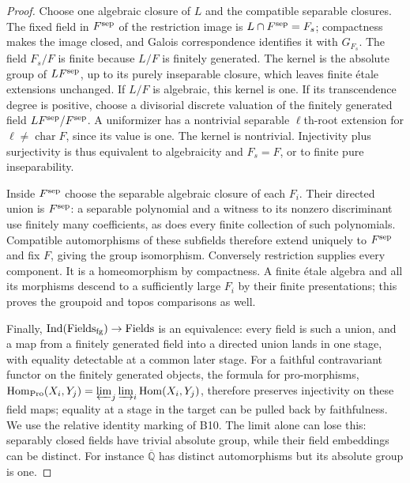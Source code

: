 \begin{proof}
Choose one algebraic closure of $L$ and the compatible separable
closures. The fixed field in $F^{\rm sep}$ of the restriction image
is $L\cap F^{\rm sep}=F_s$; compactness makes the image closed,
and Galois correspondence identifies it with $G_{F_s}$. The field
$F_s/F$ is finite because $L/F$ is finitely generated. The kernel
is the absolute group of $LF^{\rm sep}$, up to its purely
inseparable closure, which leaves finite \'etale extensions unchanged.
If $L/F$ is algebraic, this kernel is one. If its transcendence
degree is positive, choose a divisorial discrete valuation of the
finitely generated field $LF^{\rm sep}/F^{\rm sep}$. A uniformizer
has a nontrivial separable $\ell$th-root extension for
$\ell\ne\operatorname{char}F$, since its value is one. The kernel
is nontrivial. Injectivity plus surjectivity is thus equivalent to
algebraicity and $F_s=F$, or to finite pure inseparability.

Inside $F^{\rm sep}$ choose the separable algebraic closure of each
$F_i$. Their directed union is $F^{\rm sep}$: a separable polynomial
and a witness to its nonzero discriminant use finitely many
coefficients, as does every finite collection of such polynomials.
Compatible automorphisms of these subfields therefore extend uniquely
to $F^{\rm sep}$ and fix $F$, giving the group isomorphism. Conversely
restriction supplies every component. It is a homeomorphism by
compactness. A finite \'etale algebra and all its morphisms descend
to a sufficiently large $F_i$ by their finite presentations; this
proves the groupoid and topos comparisons as well.

Finally, $\operatorname{Ind}(\mathrm{Fields}_{\rm fg})\to
\mathrm{Fields}$ is an equivalence: every field is such a union,
and a map from a finitely generated field into a directed union
lands in one stage, with equality detectable at a common later
stage. For a faithful contravariant functor on the finitely generated
objects, the formula for pro-morphisms,
$\operatorname{Hom}_{\rm Pro}(X_i,Y_j)=
\varprojlim_j\varinjlim_i\operatorname{Hom}(X_i,Y_j)$,
therefore preserves injectivity on these field maps; equality at a
stage in the target can be pulled back by faithfulness. We use the
relative identity marking of B10. The limit alone can lose this:
separably closed fields have trivial absolute group, while their
field embeddings can be distinct. For instance $\overline{\mathbb Q}$
has distinct automorphisms but its absolute group is one.
\end{proof}

